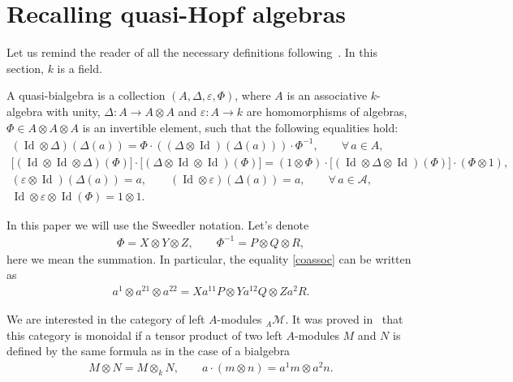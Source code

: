 \documentclass[pdftex]{sigma}
\numberwithin{equation}{section}
\begin{document}
\section{Recalling quasi-Hopf algebras}\label{s:qHopf}
 Let us remind the reader of all the necessary definitions following~\cite{Drinfeld}. In this section, $k$ is a field.
\begin{Definition}A quasi-bialgebra is a collection $(A, \Delta, \varepsilon, \Phi)$, where $A$ is an associative $k$-algebra with unity, $\Delta\colon A \rightarrow A\otimes A$ and $\varepsilon\colon A \rightarrow k $ are homomorphisms of algebras, $\Phi \in A \otimes A\otimes A$ is an invertible element, such that the following equalities hold:
\begin{gather}
(\operatorname{Id} \otimes \Delta) (\Delta (a) ) = \Phi \cdot ( (\Delta \otimes \operatorname{Id}) (\Delta(a) ) ) \cdot \Phi^{-1}, \qquad \forall\, a \in A ,\label{coassoc}\\
\lbrack (\operatorname{Id} \otimes \operatorname{Id} \otimes \Delta)(\Phi) \rbrack \cdot \lbrack (\Delta \otimes \operatorname{Id} \otimes \operatorname{Id})(\Phi) \rbrack = (1 \otimes \Phi) \cdot \lbrack (\operatorname{Id} \otimes \Delta \otimes \operatorname{Id})(\Phi) \rbrack \cdot (\Phi \otimes 1),\label{phi} \\
 (\varepsilon \otimes \operatorname{Id} ) (\Delta (a)) = a, \qquad (\operatorname{Id} \otimes \varepsilon ) (\Delta (a)) = a, \qquad \forall\, a \in \mathcal{A}, \label{one} \\
\operatorname{Id} \otimes \varepsilon \otimes \operatorname{Id} (\Phi) = 1 \otimes 1. \label{unass}
\end{gather}
\end{Definition}

 \begin{Remark}\label{Sweedler}In this paper we will use the Sweedler notation. Let's denote
 \begin{gather*}
 \Phi = X \otimes Y \otimes Z, \qquad \Phi^{-1} = P \otimes Q \otimes R ,
 \end{gather*}
here we mean the summation. In particular, the equality \eqref{coassoc} can be written as
\begin{gather*}
a^1\otimes a^{21}\otimes a^{22} = Xa^{11}P\otimes Ya^{12}Q \otimes Z a^2 R.
\end{gather*}
\end{Remark}

We are interested in the category of left $A$-modules $_A\mathcal{M}$. It was proved in~\cite{Drinfeld} that this category is monoidal if a tensor product of two left $A$-modules $M$ and $N$ is defined by the same formula as in the case of a bialgebra
\begin{gather*}
 M \otimes N = M \otimes_k N, \qquad a\cdot (m\otimes n) = a^1m\otimes a^2n.
\end{gather*}
\end{document}
